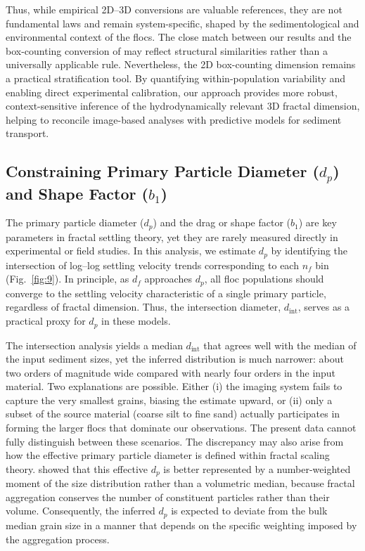 \documentclass{agujournal2019}
\providecommand{\DIFadd}[1]{{\protect\color{blue}#1}}
\begin{document}
Thus, while empirical 2D–3D conversions are valuable references, they are not fundamental laws and remain system-specific, shaped by the sedimentological and environmental context of the flocs. The close match between our results and the box-counting conversion of  may reflect structural similarities rather than a universally applicable rule. Nevertheless, the 2D box-counting dimension remains a practical stratification tool. By quantifying within-population variability and enabling direct experimental calibration, our approach provides more robust, context-sensitive inference of the hydrodynamically relevant 3D fractal dimension, helping to reconcile image-based analyses with predictive models for sediment transport.

\subsection{Constraining Primary Particle Diameter ($d_p$) and Shape Factor ($b_1$)}

The primary particle diameter ($d_p$) and the drag or shape factor ($b_1$) are key parameters in fractal settling theory, yet they are rarely measured directly in experimental or field studies. In this analysis, we estimate $d_p$ by identifying the intersection of log--log settling velocity trends corresponding to each $n_f$ bin (Fig.~\ref{fig:9}). In principle, as $d_f$ approaches $d_p$, all floc populations should converge to the settling velocity characteristic of a single primary particle, regardless of fractal dimension. Thus, the intersection diameter, $d_{\text{int}}$, serves as a practical proxy for $d_p$ in these models.

The intersection analysis yields a median $d_{\text{int}}$ that agrees well with the median of the input sediment sizes, yet the inferred distribution is much narrower: about two orders of magnitude wide compared with nearly four orders in the input material.  Two explanations are possible.  Either (i) the imaging system fails to capture the very smallest grains, biasing the estimate upward, or (ii) only a subset of the source material (coarse silt to fine sand) actually participates in forming the larger flocs that dominate our observations.  The present data cannot fully distinguish between these scenarios. \DIFadd{The discrepancy may also arise from how the effective primary particle diameter is defined within fractal scaling theory. \citeA{nghiem2024testing} showed that this effective $d_p$ is better represented by a number-weighted moment of the size distribution rather than a volumetric median, because fractal aggregation conserves the number of constituent particles rather than their volume. Consequently, the inferred $d_p$ is expected to deviate from the bulk median grain size in a manner that depends on the specific weighting imposed by the aggregation process.}
\end{document}
